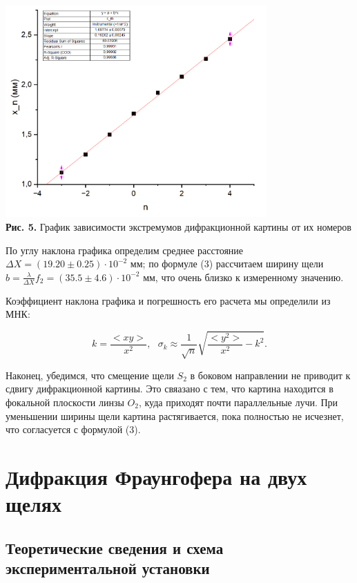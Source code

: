\documentclass[a4paper,12pt]{article} %
\begin{document}
\begin{center}
\includegraphics[width=0.75\textwidth]{4.3.1_5.png}\\
\textbf{Рис. 5.} График зависимости экстремумов дифракционной картины от их номеров \\
\end{center}

\hfill \break По углу наклона графика определим среднее расстояние $\Delta X = (19.20 \pm 0.25) \cdot 10^{-2}$ мм; по формуле (3) рассчитаем ширину щели $b = \frac {\lambda} {\Delta X} f_2 = (35.5 \pm 4.6) \cdot 10^{-2}$ мм, что очень близко к измеренному значению.  

\hfill \break Коэффициент наклона графика и погрешность его расчета мы определили из МНК: 

$$
k = \frac {<xy>} {x^2}, \text{ } \sigma_{k} \approx \frac{1} {\sqrt{n}} \sqrt{ \frac {<y^2>} {x^2} - k^2}.
$$

\hfill \break Наконец, убедимся, что смещение щели $S_2$ в боковом направлении не приводит к сдвигу дифракционной картины. Это свяазано с тем, что картина находится в фокальной плоскости линзы $O_2$, куда приходят почти параллельные лучи. При уменьшении ширины щели картина растягивается, пока полностью не исчезнет, что согласуется с формулой (3). 

\section{Дифракция Фраунгофера на двух щелях}
\subsection{Теоретические сведения и схема экспериментальной установки}
\end{document}
